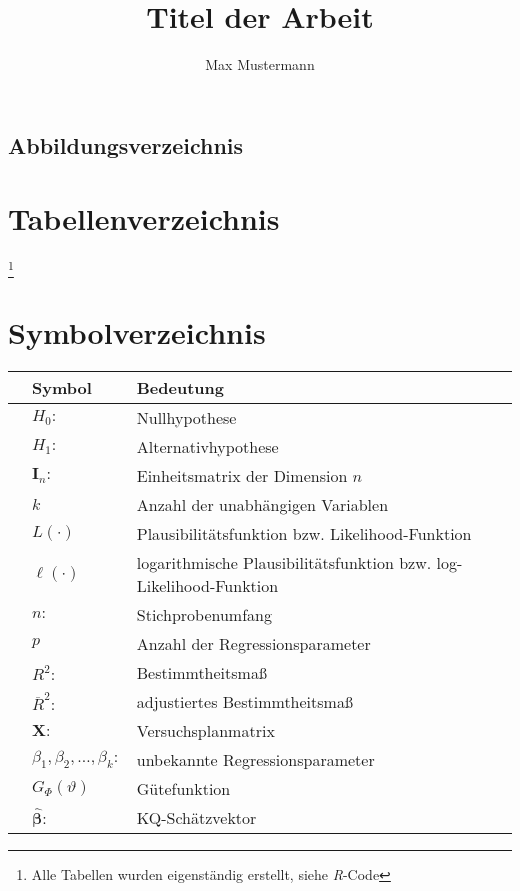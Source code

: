 \documentclass[12pt, a4paper, oneside]{article}
\title{\textbf{Titel der Arbeit}}
\author{Max Mustermann}
\begin{document}


\begin{spacing}{1}
\setcounter{page}{2}
\tableofcontents
\end{spacing}
\newpage
\begin{spacing}{1}
\section*{Abbildungsverzeichnis} 
\renewcommand{\listfigurename}{}
\listoffigures
\end{spacing}
\newpage
\section*{Tabellenverzeichnis} 
\renewcommand{\listtablename}{}
\listoftables %
\footnote{Alle Tabellen wurden eigenständig erstellt, siehe \emph{R}-Code} 
\newpage
\section*{Symbolverzeichnis} 
\begin{table}[h] \begin{center} \begin{tabular}{|lll|} \hline 
& \textbf{Symbol} & \textbf{Bedeutung} \\ \hline \hline
& $H_0 \colon$ &Nullhypothese\\ 
& $H_1 \colon$ &Alternativhypothese\\
& $\mathbf{I}_n\colon$ &Einheitsmatrix der Dimension $n$\\
& $k$ &Anzahl der unabhängigen Variablen\\
& $L(\cdot)$ &Plausibilitätsfunktion bzw. Likelihood-Funktion\\ 
& $\ell(\cdot)$ & logarithmische Plausibilitätsfunktion bzw. log-Likelihood-Funktion\\ 
& $n\colon$& Stichprobenumfang\\
& $p$ &Anzahl der Regressionsparameter\\
& $R^2\colon$ & Bestimmtheitsmaß\\ 
& $\overline{R}^2\colon$ & adjustiertes Bestimmtheitsmaß\\ 
& $\mathbf{X}\colon$& Versuchsplanmatrix \\ 
& $\beta_1,\beta_2, \ldots, \beta_k\colon$& unbekannte Regressionsparameter\\ 
& $ G_\Phi(\vartheta)$& Gütefunktion\\ 
& $\hat{\boldsymbol \beta}\colon$& KQ-Schätzvektor \\ \hline
\end{tabular} \end{center} \end{table}
\newpage
\end{document}
